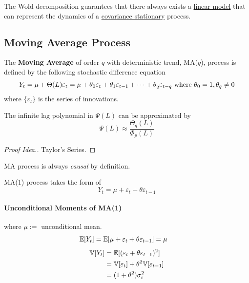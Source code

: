 \documentclass[11pt]{article}
\begin{document}
			\begin{corollary}
				The Wold decomposition guarantees that there always exists a \ul{linear model} that can represent the dynamics of a \ul{covariance stationary} process.
			\end{corollary}
		\subsection{Moving Average Process}
			\begin{definition}
				The \textbf{Moving Average} of order $q$ with deterministic trend, MA($q$), process is defined by the following stochastic difference equation
				\begin{equation}
					Y_t = \mu + \Theta(L) \varepsilon_t = \mu + \theta_0 \varepsilon_t + \theta_1 \varepsilon_{t-1} + \dots + \theta_q \varepsilon_{t-q} \text{{ where }} \theta_0 = 1, \theta_q \neq 0
				\end{equation}
				where $\{\varepsilon_t\}$ is the series of innovations.
			\end{definition}
			
			\begin{lemma}
				The infinite lag polynomial in $\Psi(L)$ can be approximated by
				\begin{equation}
					\Psi(L) \approx \frac{\Theta_q(L)}{\Phi_p(L)}
				\end{equation}
				\begin{proof}[Proof Idea.]
					Taylor's Series.
				\end{proof}
			\end{lemma}
			
			\begin{remark}
				MA process is always \emph{causal} by definition.
			\end{remark}
			
			\begin{definition}
				MA(1) process takes the form of 
				\begin{equation}
					Y_t = \mu + \varepsilon_t + \theta \varepsilon_{t-1}
				\end{equation}
			\end{definition}
			
			\paragraph{Unconditional Moments of MA(1)}where $\mu :=$ unconditional mean.
				\begin{align}
					\mathbb{E}[{Y_t}] = \mathbb{E}[{\mu + \varepsilon_t + \theta \varepsilon_{t-1}}] &= \mu 
				\end{align}
				\begin{align}
					\mathbb{V}[{Y_t}] &= \mathbb{E}[{(\varepsilon_t + \theta \varepsilon_{t-1})^2}] \\
					&= \mathbb{V}[{\varepsilon_t}] + \theta^2 \mathbb{V}[{\varepsilon_{t-1}}] \\
					&= (1 + \theta^2) \sigma_\varepsilon^2
				\end{align}
\end{document}
